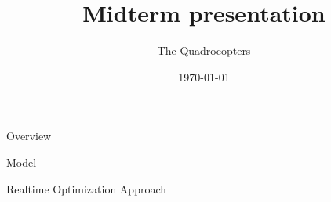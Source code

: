 \documentclass[12pt]{beamer}
\title{Midterm presentation}
\author{The Quadrocopters}
\institute{Technische Universität München}
\date{\today}
\begin{document}
\begin{frame}
\maketitle
\end{frame}

\begin{frame}{Overview}
\tableofcontents
\end{frame}

%


\begin{frame}{ }
\begin{block}{ }
\centering
\LARGE
 \vspace{1ex}
Model \\
\vspace{1ex}
\end{block}
\end{frame}

\begin{frame}{ }
\begin{block}{ }
\centering
\LARGE
 \vspace{1ex}
Realtime Optimization Approach\\
\vspace{1ex}
\end{block}
\end{frame}

\end{document}
